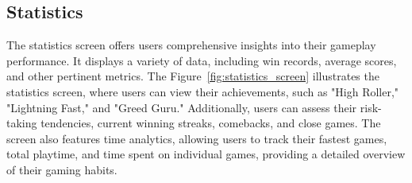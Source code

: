 \subsection{Statistics}

The statistics screen offers users comprehensive insights into their gameplay performance. It displays a variety of data, including win records, average scores, and other pertinent metrics. The Figure~\ref{fig:statistics_screen} illustrates the statistics screen, where users can view their achievements, such as "High Roller," "Lightning Fast," and "Greed Guru." Additionally, users can assess their risk-taking tendencies, current winning streaks, comebacks, and close games. The screen also features time analytics, allowing users to track their fastest games, total playtime, and time spent on individual games, providing a detailed overview of their gaming habits.

